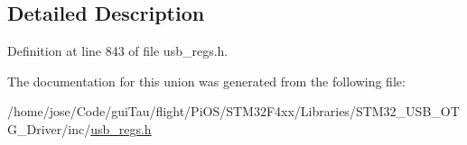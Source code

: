 \subsection{Detailed Description}


Definition at line 843 of file usb\-\_\-regs.\-h.



The documentation for this union was generated from the following file\-:\begin{DoxyCompactItemize}
\item 
/home/jose/\-Code/gui\-Tau/flight/\-Pi\-O\-S/\-S\-T\-M32\-F4xx/\-Libraries/\-S\-T\-M32\-\_\-\-U\-S\-B\-\_\-\-O\-T\-G\-\_\-\-Driver/inc/\hyperlink{_s_t_m32_f4xx_2_libraries_2_s_t_m32___u_s_b___o_t_g___driver_2inc_2usb__regs_8h}{usb\-\_\-regs.\-h}\end{DoxyCompactItemize}
